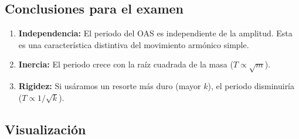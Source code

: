 \documentclass[
  letterpaper,
  DIV=11,
  numbers=noendperiod]{scrreprt}
\providecommand{\tightlist}{%
  \setlength{\itemsep}{0pt}\setlength{\parskip}{0pt}}
\begin{document}
\subsection{Conclusiones para el
examen}\label{conclusiones-para-el-examen}

\begin{enumerate}
\def\labelenumi{\arabic{enumi}.}
\tightlist
\item
  \textbf{Independencia:} El periodo del OAS es independiente de la
  amplitud. Esta es una característica distintiva del movimiento
  armónico simple.
\item
  \textbf{Inercia:} El periodo crece con la raíz cuadrada de la masa
  (\(T \propto \sqrt{m}\)).
\item
  \textbf{Rigidez:} Si usáramos un resorte más duro (mayor \(k\)), el
  periodo disminuiría (\(T \propto 1/\sqrt{k}\)).
\end{enumerate}

\subsection{Visualización}\label{visualizaciuxf3n-2}
\end{document}
